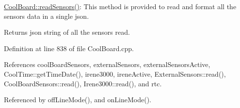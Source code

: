 \hyperlink{classCoolBoard_ad03abdce2e65f520bbf2cff0f2d083cf}{Cool\+Board\+::read\+Sensors()}\+: This method is provided to read and format all the sensors data in a single json.

\begin{DoxyReturn}{Returns}
json string of all the sensors read. 
\end{DoxyReturn}


Definition at line 838 of file Cool\+Board.\+cpp.



References cool\+Board\+Sensors, external\+Sensors, external\+Sensors\+Active, Cool\+Time\+::get\+Time\+Date(), irene3000, irene\+Active, External\+Sensors\+::read(), Cool\+Board\+Sensors\+::read(), Irene3000\+::read(), and rtc.



Referenced by off\+Line\+Mode(), and on\+Line\+Mode().


